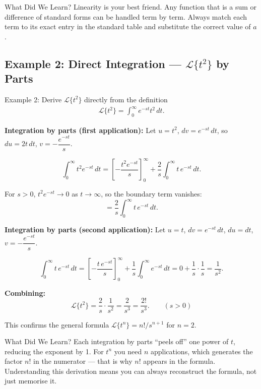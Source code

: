 \documentclass[12pt,a4paper]{article}
\begin{document}
\begin{learnbox}{What Did We Learn?}
Linearity is your best friend. Any function that is a sum or difference of standard forms can be handled term by term. Always match each term to its exact entry in the standard table and substitute the correct value of $a$.
\end{learnbox}

\subsection{Example 2: Direct Integration --- $\mathcal{L}\{t^2\}$ by Parts}

\begin{infobox}{Example 2: Derive $\mathcal{L}\{t^2\}$ directly from the definition}
\begin{align*}
\mathcal{L}\{t^2\} = \int_0^{\infty} e^{-st} t^2\,dt.
\end{align*}

\textbf{Integration by parts (first application):} Let $u = t^2$, $dv = e^{-st}\,dt$, so $du = 2t\,dt$, $v = -\dfrac{e^{-st}}{s}$.

\[
\int_0^{\infty} t^2 e^{-st}\,dt
  = \left[-\frac{t^2 e^{-st}}{s}\right]_0^{\infty} + \frac{2}{s}\int_0^{\infty} t\,e^{-st}\,dt.
\]

For $s > 0$, $t^2 e^{-st} \to 0$ as $t \to \infty$, so the boundary term vanishes:
\[
= \frac{2}{s}\int_0^{\infty} t\,e^{-st}\,dt.
\]

\textbf{Integration by parts (second application):} Let $u = t$, $dv = e^{-st}\,dt$, $du = dt$, $v = -\dfrac{e^{-st}}{s}$.

\[
\int_0^{\infty} t\,e^{-st}\,dt
  = \left[-\frac{t\,e^{-st}}{s}\right]_0^{\infty} + \frac{1}{s}\int_0^{\infty} e^{-st}\,dt
  = 0 + \frac{1}{s}\cdot\frac{1}{s}
  = \frac{1}{s^2}.
\]

\textbf{Combining:}
\[
\mathcal{L}\{t^2\} = \frac{2}{s} \cdot \frac{1}{s^2} = \frac{2}{s^3} = \frac{2!}{s^3}. \qquad (s > 0)
\]

This confirms the general formula $\mathcal{L}\{t^n\} = n!/s^{n+1}$ for $n = 2$.
\end{infobox}

\begin{learnbox}{What Did We Learn?}
Each integration by parts ``peels off'' one power of $t$, reducing the exponent by 1. For $t^n$ you need $n$ applications, which generates the factor $n!$ in the numerator --- that is why $n!$ appears in the formula. Understanding this derivation means you can always reconstruct the formula, not just memorise it.
\end{learnbox}
\end{document}

